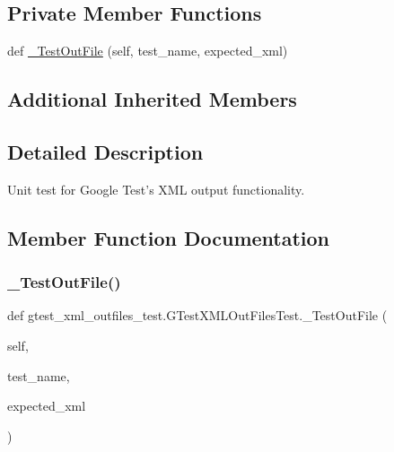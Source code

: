 \subsection*{Private Member Functions}
\begin{DoxyCompactItemize}
\item 
def \mbox{\hyperlink{classgtest__xml__outfiles__test_1_1_g_test_x_m_l_out_files_test_afad9d1d25939817efba8f5bd2c9039c2}{\+\_\+\+Test\+Out\+File}} (self, test\+\_\+name, expected\+\_\+xml)
\end{DoxyCompactItemize}
\subsection*{Additional Inherited Members}


\subsection{Detailed Description}
\begin{DoxyVerb}Unit test for Google Test's XML output functionality.\end{DoxyVerb}
 

\subsection{Member Function Documentation}
\mbox{\label{classgtest__xml__outfiles__test_1_1_g_test_x_m_l_out_files_test_afad9d1d25939817efba8f5bd2c9039c2}} 
\subsubsection{\texorpdfstring{\_TestOutFile()}{\_TestOutFile()}}
{\footnotesize\ttfamily def gtest\+\_\+xml\+\_\+outfiles\+\_\+test.\+G\+Test\+X\+M\+L\+Out\+Files\+Test.\+\_\+\+Test\+Out\+File (\begin{DoxyParamCaption}\item[{}]{self,  }\item[{}]{test\+\_\+name,  }\item[{}]{expected\+\_\+xml }\end{DoxyParamCaption})\hspace{0.3cm}{\ttfamily [private]}}

